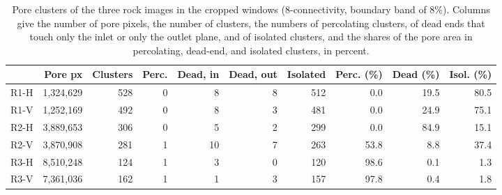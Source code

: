 \begin{table}[htbp]
\centering
\caption{Pore clusters of the three rock images in the cropped windows (8-connectivity, boundary band of $8\%$). Columns give the number of pore pixels, the number of clusters, the numbers of percolating clusters, of dead ends that touch only the inlet or only the outlet plane, and of isolated clusters, and the shares of the pore area in percolating, dead-end, and isolated clusters, in percent.}
\label{tab:clusters}
\small
\begin{tabular}{lrrrrrrrrr}
\toprule
 & Pore px & Clusters & Perc. & Dead, in & Dead, out & Isolated & Perc. (\%) & Dead (\%) & Isol. (\%) \\
\midrule
R1-H & 1,324,629 & 528 & 0 & 8 & 8 & 512 & 0.0 & 19.5 & 80.5 \\
R1-V & 1,252,169 & 492 & 0 & 8 & 3 & 481 & 0.0 & 24.9 & 75.1 \\
R2-H & 3,889,653 & 306 & 0 & 5 & 2 & 299 & 0.0 & 84.9 & 15.1 \\
R2-V & 3,870,908 & 281 & 1 & 10 & 7 & 263 & 53.8 & 8.8 & 37.4 \\
R3-H & 8,510,248 & 124 & 1 & 3 & 0 & 120 & 98.6 & 0.1 & 1.3 \\
R3-V & 7,361,036 & 162 & 1 & 1 & 3 & 157 & 97.8 & 0.4 & 1.8 \\
\bottomrule
\end{tabular}
\end{table}
